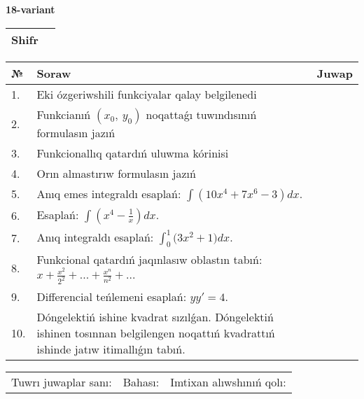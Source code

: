 \documentclass{article}
\begin{document}
  \egroup
  
  \newpage
  
  
  \textbf{18-variant}\\
  
  \bgroup
  \def\arraystretch{1.6} %
  
  \begin{tabular}{|m{5.7cm}|m{9.5cm}|}
  \hline
  Shifr & \\
  \hline
  \end{tabular}
  
  \vspace{1cm}
  
  \begin{tabular}{|m{0.7cm}|m{10cm}|m{4cm}|}
  \hline
  № & Soraw & Juwap \\
  \hline
  1. & Eki ózgeriwshili funkciyalar qalay belgilenedi &  \\
  \hline
  2. & Funkcianıń \((x_{0},\ y_{0})\) noqattaǵı tuwındısınıń formulasın jazıń &  \\
  \hline
  3. & Funkcionallıq qatardıń uluwma kórinisi &  \\
  \hline
  4. & Orın almastırıw formulasın jazıń &  \\
  \hline
  5. & Anıq emes integraldı esaplań: \(\int{\left( 10x^{4} + 7x^{6} - 3 \right)dx}\). &  \\
  \hline
  6. & Esaplań: \(\int\left( x^{4} - \frac{1}{x} \right)dx\). &  \\
  \hline
  7. & Anıq integraldı esaplań: \(\int_{0}^{1}{(3x^2 } + 1)dx\). &  \\
  \hline
  8. & Funkcional qatardıń jaqınlasıw oblastın tabıń: \(x + \frac{x^2 }{2^2 } + ... + \frac{x^{n}}{n^2 } + ...\) &  \\
  \hline
  9. & Differencial teńlemeni esaplań: \(yy' = 4\). &  \\
  \hline
  10. & Dóngelektiń ishine kvadrat sızılǵan. Dóngelektiń ishinen tosınnan belgilengen noqattıń kvadrattıń ishinde jatıw itimallıǵın tabıń. &  \\
  \hline
  \end{tabular}
  
  \vspace{1cm}
  
  \begin{tabular}{lll}
  Tuwrı juwaplar sanı: \underline{\hspace{1.5cm}} & 
  Bahası: \underline{\hspace{1.5cm}} & 
  Imtixan alıwshınıń qolı: \underline{\hspace{2cm}} \\
  \end{tabular}
  
\end{document}
